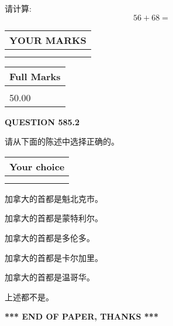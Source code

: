 \documentclass{ctexart}
\begin{document}
  
 
请计算:
\begin{equation}
56 +  %
68 = \nonumber
\end{equation}
 

 

 
  
\vspace{0.2in}
  
\noindent\begin{tabular}{|l|}
\hline
 YOUR MARKS  \\
\hline
 \\ 
 \\ 
\hline
\end{tabular}
\hspace{0.05in} \begin{tabular}{|l|}
\hline
 Full Marks  \\
\hline
 \\ 
50.00 \\
\hline
\end{tabular}
{\textbf{\Large{QUESTION
585.2 
}}}
  
  
请从下面的陈述中选择正确的。
  
  
\noindent\hspace{3.0in} \begin{tabular}{|l|}
\hline
Your choice \\
\hline
 \\ 
 \\ 
\hline
\end{tabular}
  
  
 
 
加拿大的首都是魁北克市。
 
 
加拿大的首都是蒙特利尔。
 
 
加拿大的首都是多伦多。
 
 
加拿大的首都是卡尔加里。
 
 
加拿大的首都是温哥华。
 
 
 上述都不是。
 
 
   
   
 \vspace{0.2in}
 
   
   
   
   
\vspace{1.0in} 
{\textbf{\large{ *** END OF PAPER, THANKS *** }}} 
   
\end{document}
